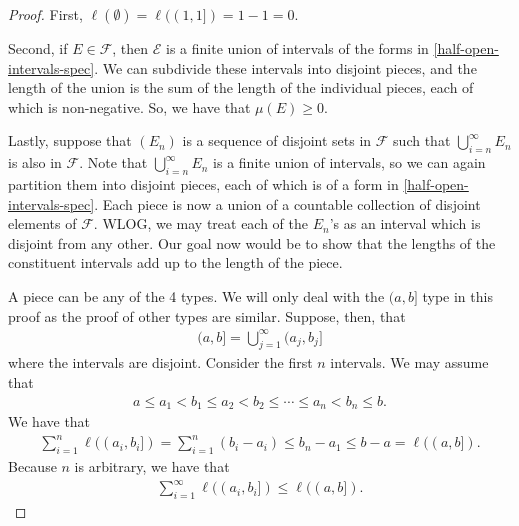 \documentclass[10pt]{article}
\newcommand{\mcal}[1]{\mathcal{#1}}
\begin{document}
\begin{itemize}
  \begin{proof}
    First, $\ell(\emptyset) = \ell((1,1]) = 1 - 1 = 0$.

    Second, if $E \in \mcal{F}$, then $\mcal{E}$ is a finite union of intervals of the forms in \eqref{half-open-intervals-spec}. We can subdivide these intervals into disjoint pieces, and the length of the union is the sum of the length of the individual pieces, each of which is non-negative. So, we have that $\mu(E) \geq 0$.

    Lastly, suppose that $(E_n)$ is a sequence of disjoint sets in $\mcal{F}$ such that $\bigcup_{i=n}^\infty E_n$ is also in $\mcal{F}$. Note that $\bigcup_{i=n}^\infty E_n$ is a finite union of intervals, so we can again partition them into disjoint pieces, each of which is of a form in \eqref{half-open-intervals-spec}. Each piece is now a union of a countable collection of disjoint elements of $\mcal{F}$. WLOG, we may treat each of the $E_n$'s as an interval which is disjoint from any other. Our goal now would be to show that the lengths of the constituent intervals add up to the length of the piece.

    A piece can be any of the 4 types. We will only deal with the $(a,b]$ type in this proof as the proof of other types are similar. Suppose, then, that
    \begin{align*}
      (a,b] = \bigcup_{j=1}^\infty (a_j, b_j]
    \end{align*}
    where the intervals are disjoint. Consider the first $n$ intervals. We may assume that
    \begin{align*}
      a \leq a_1 < b_1 \leq a_2 < b_2 \leq \dotsb \leq a_n < b_n \leq b.
    \end{align*}
    We have that
    \begin{align*}
      \sum_{i=1}^n \ell((a_i, b_i]) = \sum_{i=1}^n (b_i - a_i) \leq b_n - a_1 \leq b-a = \ell((a,b]).
    \end{align*}
    Because $n$ is arbitrary, we have that    
    \begin{align*}
      \sum_{i=1}^\infty \ell((a_i, b_i]) \leq \ell((a,b]).
    \end{align*}


\end{proof}
\end{itemize}
\end{document}

